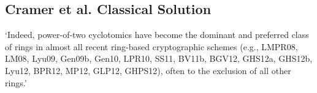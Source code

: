 \subsection{Cramer et al. Classical Solution}


`Indeed, power-of-two cyclotomics have become the dominant and preferred class of rings in almost all recent ring-based cryptographic schemes (e.g., LMPR08, LM08, Lyu09, Gen09b, Gen10, LPR10, SS11, BV11b, BGV12, GHS12a, GHS12b, Lyu12, BPR12, MP12, GLP12, GHPS12), often to the exclusion of all other rings.' \cite{Cra2015}

